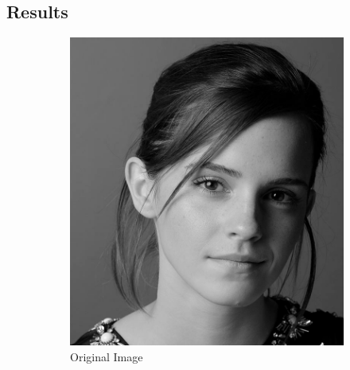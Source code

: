\documentclass[11pt]{article}
\begin{document}
\subsection*{Results}
\begin{figure}[H]
    \centering
    \begin{subfigure}{0.3\textwidth}
        \includegraphics[width=\textwidth]{resources/emma_original.jpg}
        \caption{Original Image}
    \end{subfigure}
    \hfill
    \begin{subfigure}{0.3\textwidth}

\end{subfigure}
\end{figure}
\end{document}
